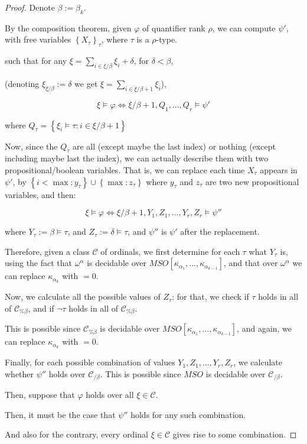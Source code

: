 \documentclass{article}
\newcommand{\brackets}[1]{\left[ {#1} \right]}
\newcommand{\braces}[1]{\left\{ {#1} \right\}}
\newcommand{\setcomp}[1]{\braces{#1}}
\newcommand{\kk}[1]{{\kappa}_{#1}}
\newcommand{\CC}{\mathcal{C}}
\begin{document}
\begin{proof}
    Denote $\beta := \beta_k$.

    By the composition theorem, given $\varphi$ of quantifier rank $\rho$,
    we can compute $\psi'$,
    with free variables $\braces{X_\tau}_\tau$,
    where $\tau$ is a $\rho$-type.

    such that for any $\xi = \sum_{i \in \xi / \beta} \xi_i + \delta$,
    for $\delta < \beta$,
    
    (denoting $\xi_{\xi / \beta} := \delta$ we get $\xi = \sum_{i \in \xi / \beta + 1} \xi_i$),
    
    $$
    \xi \vDash \varphi \iff \xi/\beta + 1, Q_1, ..., Q_r\vDash \psi'
    $$

    where $Q_\tau = \setcomp{\xi_i \vDash \tau : i \in \xi / \beta + 1}$

    Now, since the $Q_\tau$ are all (except maybe the last index) or
    nothing (except including maybe last the index),
    we can actually describe them with two propositional/boolean variables.
    That is, we can replace each time $X_\tau$ appears in $\psi'$,
    by $\setcomp{i < \max : y_\tau} \cup \setcomp{\max : z_\tau}$
    where $y_\tau$ and $z_\tau$ are two new propositional variables, and then:

    $$
    \xi \vDash \varphi \iff \xi/\beta + 1, Y_1, Z_1, ..., Y_r, Z_r\vDash \psi''
    $$

    where $Y_\tau := \beta \vDash \tau$,
    and $Z_\tau := \delta \vDash \tau$,
    and $\psi''$ is $\psi'$ after the replacement.

    Therefore, given a class $\CC$ of ordinals,
    we first determine for each $\tau$ what $Y_\tau$ is,
    using the fact that $\omega^\alpha$ is decidable over $MSO \brackets{\kk{\alpha_1}, ..., \kk{\alpha_{k-1}}}$,
    and that over $\omega^\alpha$ we can replace $\kk{\alpha_k}$ with $=0$.

    Now, we calculate all the possible values of $Z_\tau$: for that,
    we check if $\tau$ holds in all of $\CC_{\% \beta}$, and if
    $\neg \tau$ holds in all of $\CC_{\% \beta}$.

    This is possible since $\CC_{\% \beta}$ is decidable over $MSO \brackets{\kk{\alpha_1}, ..., \kk{\alpha_{k-1}}}$,
    and again, we can replace $\kk{\alpha_k}$ with $=0$.

    Finally, for each possible combination of values
    $Y_1, Z_1, ..., Y_r, Z_r$, we calculate whether $\psi''$ holds over
    $\CC_{/\beta}$. This is possible since $MSO$ is decidable over $\CC_{/\beta}$.
    

    Then, suppose that $\varphi$ holds over all $\xi \in \CC$.

    Then, it must be the case that
    $\psi''$ holds for any such combination. 

    And also for the contrary, every ordinal $\xi \in \CC$ gives rise to some combination.
\end{proof}
\end{document}
